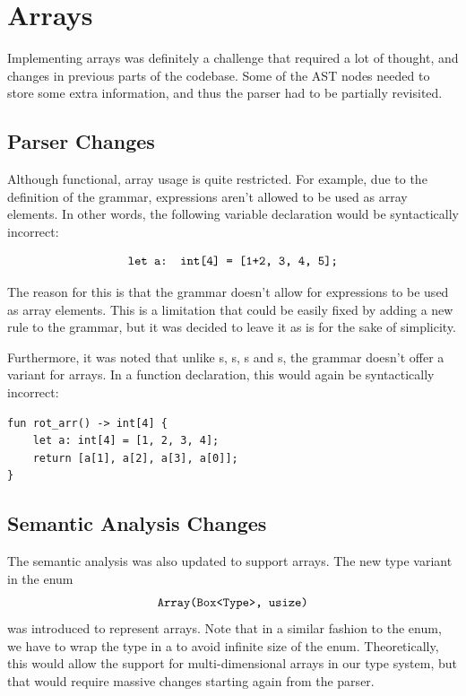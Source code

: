 \section{Arrays}

Implementing arrays was definitely a challenge that required a lot of thought,
and changes in previous parts of the codebase. Some of the AST nodes needed to
store some extra information, and thus the parser had to be partially revisited.

\subsection{Parser Changes}

Although functional, array usage is quite restricted. For example, due to the
definition of the grammar, expressions aren't allowed to be used as array elements. In other words, the following
variable declaration would be syntactically incorrect:

$$ \texttt{let a: int[4] = [1+2, 3, 4, 5];} $$

The reason for this is that the grammar doesn't allow for expressions to be used
as array elements. This is a limitation that could be easily fixed by adding a
new rule to the grammar, but it was decided to leave it as is for the sake of
simplicity.

Furthermore, it was noted that unlike s, s, s
and s, the grammar doesn't offer a  variant for arrays.
In a function declaration, this would again be syntactically incorrect:

{\lstset{xleftmargin=0.25\textwidth}
\begin{lstlisting}
fun rot_arr() -> int[4] {
    let a: int[4] = [1, 2, 3, 4];
    return [a[1], a[2], a[3], a[0]];
}
\end{lstlisting}}

\subsection{Semantic Analysis Changes}

The semantic analysis was also updated to support arrays. The new type variant
in the  enum $$\texttt{Array(Box<Type>, usize)}$$ was introduced to
represent arrays. Note that in a similar fashion to the  enum, we
have to wrap the type in a  to avoid infinite size of the 
enum. Theoretically, this would allow the support for multi-dimensional arrays
in our type system, but that would require massive changes starting again from
the parser.

